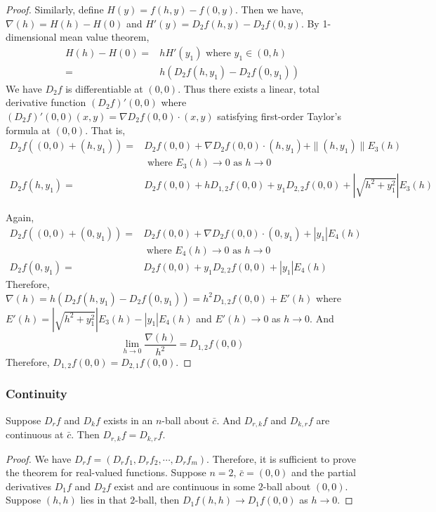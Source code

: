 \begin{proof}
Similarly, define $H(y) = f(h,y)-f(0,y)$.
Then we have, $\nabla(h) = H(h)-H(0)$ and $H'(y) = D_2f(h,y) - D_2f(0,y)$.
By 1-dimensional mean value theorem,
\begin{align*}
	H(h)-H(0) = & hH'(y_1)  \text{ where } y_1 \in (0,h) \\
	= & h \left( D_2f(h,y_1)-D_2f(0,y_1) \right)
\end{align*}
We have $D_2 f$ is differentiable at $(0,0)$.
Thus there exists a linear, total derivative function $(D_2f)'(0,0)$ where $(D_2f)'(0,0)(x,y) = \nabla D_2 f(0,0) \cdot{} (x,y)$ satisfying first-order Taylor's formula at $(0,0)$.
That is,
\begin{align*}
	D_2 f((0,0)+(h,y_1)) = & D_2 f(0,0) + \nabla D_2 f(0,0) \cdot{} (h,y_1) + \|(h,y_1)\| E_3(h) \\
	& \text{ where } E_3(h) \to 0 \text{ as } h \to 0 \\
	D_2 f(h,y_1) = & D_2 f(0,0) + h D_{1,2} f(0,0) + y_1 D_{2,2} f(0,0) + \left|\sqrt{h^2+y_1^2}\right| E_3(h)
\end{align*}

Again,
\begin{align*}
	D_2 f((0,0)+(0,y_1)) = & D_2 f(0,0) + \nabla D_2 f(0,0) \cdot{} (0,y_1) + |y_1| E_4(h) \\
	& \text{ where } E_4(h) \to 0 \text{ as } h \to 0 \\
	D_2 f(0,y_1) = & D_2 f(0,0) + y_1 D_{2,2} f(0,0) + |y_1| E_4(h)
\end{align*}
Therefore, $\nabla(h) = h( D_2 f(h,y_1) - D_2 f(0,y_1) ) = h^2 D_{1,2} f(0,0) + E'(h)$ where $E'(h) = \left|\sqrt{h^2+y_1^2}\right| E_3(h) - |y_1|E_4(h)$ and $E'(h) \to 0$ as $h \to 0$. And 
\begin{equation}
	\lim_{h \to 0} \frac{\nabla(h)}{h^2}  = D_{1,2} f(0,0)
\end{equation}
Therefore, $D_{1,2} f(0,0) = D_{2,1} f(0,0)$.
\end{proof}

\subsubsection{Continuity}
\begin{theorem}
Suppose $D_r f$ and $D_k f$ exists in an $n$-ball about $\bar{c}$.
And $D_{r,k} f$ and $D_{k,r} f$ are continuous at $\bar{c}$.
Then $D_{r,k} f = D_{k,r} f$.
\end{theorem}
\begin{proof}
We have $D_r f = (D_r f_1 , D_r f_2, \cdots, D_r f_m)$.
Therefore, it is sufficient to prove the theorem for real-valued functions.
Suppose $n = 2$, $\bar{c} = (0,0)$ and the partial derivatives $D_1 f$ and $D_2 f$ exist and are continuous in some $2$-ball about $(0,0)$.
Suppose $(h,h)$ lies in that $2$-ball, then $D_1 f(h,h) \to D_1 f(0,0)$ as $h \to 0$.
\end{proof}

